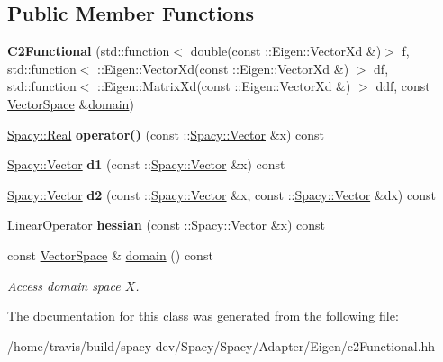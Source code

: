 \subsection*{\-Public \-Member \-Functions}
\begin{DoxyCompactItemize}
\item 
\hypertarget{classSpacy_1_1Rn_1_1C2Functional_a6d17f9e30a1c0fb522a0a135de96f72a}{{\bfseries \-C2\-Functional} (std\-::function$<$ double(const \-::\-Eigen\-::\-Vector\-Xd \&)$>$ f, std\-::function$<$ \-::\-Eigen\-::\-Vector\-Xd(const \-::\-Eigen\-::\-Vector\-Xd \&) $>$ df, std\-::function$<$ \-::\-Eigen\-::\-Matrix\-Xd(const \-::\-Eigen\-::\-Vector\-Xd \&) $>$ ddf, const \hyperlink{classSpacy_1_1VectorSpace}{\-Vector\-Space} \&\hyperlink{classSpacy_1_1FunctionalBase_a2d3397deb9fa1ad85ed04e37a03b3aa6}{domain})}\label{classSpacy_1_1Rn_1_1C2Functional_a6d17f9e30a1c0fb522a0a135de96f72a}

\item 
\hypertarget{classSpacy_1_1Rn_1_1C2Functional_ad69e7f55b9647b34f6e132e7c831c46f}{\hyperlink{classSpacy_1_1Real}{\-Spacy\-::\-Real} {\bfseries operator()} (const \-::\hyperlink{classSpacy_1_1Vector}{\-Spacy\-::\-Vector} \&x) const }\label{classSpacy_1_1Rn_1_1C2Functional_ad69e7f55b9647b34f6e132e7c831c46f}

\item 
\hypertarget{classSpacy_1_1Rn_1_1C2Functional_a5bfa18cf358557d1d1cc3d2a76022660}{\hyperlink{classSpacy_1_1Vector}{\-Spacy\-::\-Vector} {\bfseries d1} (const \-::\hyperlink{classSpacy_1_1Vector}{\-Spacy\-::\-Vector} \&x) const }\label{classSpacy_1_1Rn_1_1C2Functional_a5bfa18cf358557d1d1cc3d2a76022660}

\item 
\hypertarget{classSpacy_1_1Rn_1_1C2Functional_a4ebc4d850e0c11707a9d4c14f085e920}{\hyperlink{classSpacy_1_1Vector}{\-Spacy\-::\-Vector} {\bfseries d2} (const \-::\hyperlink{classSpacy_1_1Vector}{\-Spacy\-::\-Vector} \&x, const \-::\hyperlink{classSpacy_1_1Vector}{\-Spacy\-::\-Vector} \&dx) const }\label{classSpacy_1_1Rn_1_1C2Functional_a4ebc4d850e0c11707a9d4c14f085e920}

\item 
\hypertarget{classSpacy_1_1Rn_1_1C2Functional_a81b74f77f5680529d82cebde572643e4}{\hyperlink{classSpacy_1_1Rn_1_1LinearOperator}{\-Linear\-Operator} {\bfseries hessian} (const \-::\hyperlink{classSpacy_1_1Vector}{\-Spacy\-::\-Vector} \&x) const }\label{classSpacy_1_1Rn_1_1C2Functional_a81b74f77f5680529d82cebde572643e4}

\item 
\hypertarget{classSpacy_1_1FunctionalBase_a2d3397deb9fa1ad85ed04e37a03b3aa6}{const \hyperlink{classSpacy_1_1VectorSpace}{\-Vector\-Space} \& \hyperlink{classSpacy_1_1FunctionalBase_a2d3397deb9fa1ad85ed04e37a03b3aa6}{domain} () const }\label{classSpacy_1_1FunctionalBase_a2d3397deb9fa1ad85ed04e37a03b3aa6}

\begin{DoxyCompactList}\small\item\em \-Access domain space $X$. \end{DoxyCompactList}\end{DoxyCompactItemize}


\-The documentation for this class was generated from the following file\-:\begin{DoxyCompactItemize}
\item 
/home/travis/build/spacy-\/dev/\-Spacy/\-Spacy/\-Adapter/\-Eigen/c2\-Functional.\-hh\end{DoxyCompactItemize}
